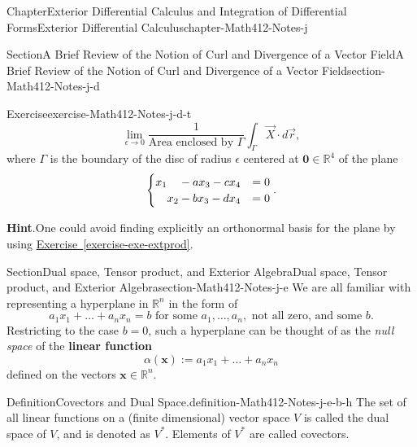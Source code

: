\documentclass[oneside,10pt,]{book}
\newcommand{\blocktitlefont}{\relax}
\newcommand{\xreffont}{\relax}
\newcommand{\terminology}[1]{\textbf{#1}}
\numberwithin{equation}{section}
\newcommand{\bbR}{\mathbb{R}}
\newcommand{\amp}{&}
\begin{document}
\begin{chapterptx}{Chapter}{Exterior Differential Calculus and Integration of Differential Forms}{}{Exterior Differential Calculus}{}{}{chapter-Math412-Notes-j}
\begin{sectionptx}{Section}{A Brief Review of the Notion of Curl and Divergence of a Vector Field}{}{A Brief Review of the Notion of Curl and Divergence of a Vector Field}{}{}{section-Math412-Notes-j-d}
\begin{inlineexercise}{Exercise}{}{exercise-Math412-Notes-j-d-t}
\begin{equation*}
\lim_{\epsilon\to 0}\frac{1}{\text{Area enclosed by } \Gamma} \int_{\Gamma} \vec{X}\cdot d\vec{r},
\end{equation*}
where  \(\Gamma\) is the boundary of the disc of radius \(\epsilon\) centered at \(\mathbf 0 \in \bbR^{4}\) of the plane%
\begin{equation*}
\begin{cases} x_{1} \hphantom{x_{2}}-a x_{3}-c x_{4} \amp =0 \\
\hphantom{x_{2}} x_{2} -b x_{3} - d x_{4} \amp =0\\
\end{cases}\text{.}
\end{equation*}
%
\par\smallskip%
\noindent\textbf{\blocktitlefont Hint}.\hypertarget{hint-Math412-Notes-j-d-t-b}{}\quad{}One could avoid finding explicitly an orthonormal basis for the plane by using \hyperref[exercise-exe-extprod]{Exercise~{\xreffont\ref{exercise-exe-extprod}}}.\end{inlineexercise}%
\end{sectionptx}
%
%
\typeout{************************************************}
\typeout{************************************************}
%
\begin{sectionptx}{Section}{Dual space, Tensor product, and Exterior Algebra}{}{Dual space, Tensor product, and Exterior Algebra}{}{}{section-Math412-Notes-j-e}
We are all familiar with representing a hyperplane in \(\mathbb R^{n}\) in the form of%
\begin{equation*}
a_{1}x_{1}+\ldots+a_{n}x_{n}=b 
\text{ for some }a_{1},\ldots, a_{n}, \text{ not all zero, and some } b.
\end{equation*}
Restricting to the case \(b=0\), such a hyperplane can be thought of as the \emph{null space} of the \terminology{linear function}%
\begin{equation*}
\alpha ({\mathbf x}) := a_{1}x_{1}+\ldots+a_{n}x_{n}
\end{equation*}
defined on the vectors \({\mathbf x}\in {\mathbb R}^{n}\). \begin{definition}{Definition}{Covectors and Dual Space.}{definition-Math412-Notes-j-e-b-h}%
The set of all linear functions on a (finite dimensional) vector space \(V\) is called the dual space of \(V\), and is denoted as \(V^{*}\). Elements of \(V^{*}\) are called covectors.%
\par

\end{definition}
\end{sectionptx}
\end{chapterptx}
\end{document}
